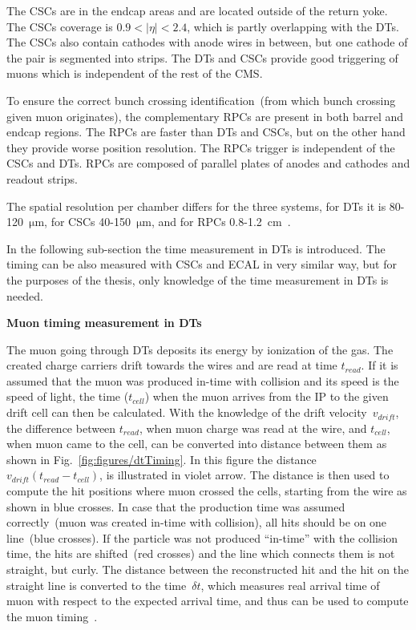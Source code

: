 The CSCs are in the endcap areas and are located outside of the return yoke. The CSCs coverage is $0.9<|\eta|<2.4$, which is partly overlapping with the DTs. The CSCs also contain cathodes with anode wires in between, but one cathode of the pair is segmented into strips. The DTs and CSCs provide good triggering of muons which is independent of the rest of the CMS.

To ensure the correct bunch crossing identification~(from which bunch crossing given muon originates), the complementary RPCs are present in both barrel and endcap regions. The RPCs are faster than DTs and CSCs, but on the other hand they provide worse position resolution. The RPCs trigger is independent of the CSCs and DTs. RPCs are composed of parallel plates of anodes and cathodes and readout strips. 

The spatial resolution per chamber differs for the three systems, for DTs it is 80-120~$\mathrm{\mu m}$, for CSCs 40-150~$\mathrm{\mu m}$, and for RPCs 0.8-1.2~$\mathrm{cm}$~\cite{Chatrchyan:2013sba}.

In the following sub-section the time measurement in DTs is introduced. The timing can be also measured with CSCs and ECAL in very similar way, but for the purposes of the thesis, only knowledge of the time measurement in DTs is needed.


\textbf{Muon timing measurement in DTs}

The muon going through DTs deposits its energy by ionization of the gas. The created charge carriers drift towards the wires and are read at time $t_{read}$. If it is assumed that the muon was produced in-time with collision and its speed is the speed of light, the time ($t_{cell}$) when the muon arrives from the IP to the given drift cell can then be calculated. With the knowledge of the drift velocity~$v_{drift}$, the difference between $t_{read}$, when muon charge was read at the wire, and $t_{cell}$, when muon came to the cell, can be converted into distance between them as shown in Fig.~\ref{fig:figures/dtTiming}. In this figure the distance $ v_{drift} (t_{read} - t_{cell})$, is illustrated in violet arrow. The distance is then used to compute the hit positions where muon crossed the cells, starting from the wire as shown in blue crosses. In case that the production time was assumed correctly~(muon was created in-time with collision), all hits should be on one line~(blue crosses). If the particle was not produced ``in-time'' with the collision time, the hits are shifted~(red crosses) and the line which connects them is not straight, but curly. The distance between the reconstructed hit and the hit on the straight line is converted to the time~$\delta t$, which measures real arrival time of muon with respect to the expected arrival time, and thus can be used to compute the muon timing~\cite{Traczyk:1365029}.


